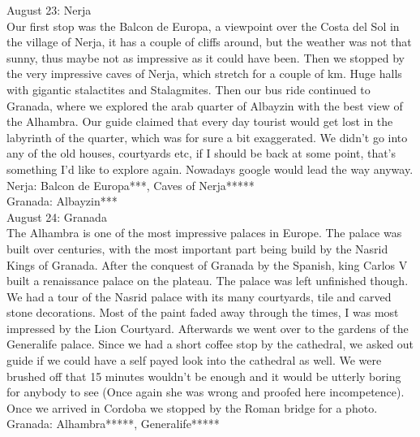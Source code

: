August 23: Nerja\\
Our first stop was the Balcon de Europa, a viewpoint over the Costa del Sol in the village of Nerja, it has a couple of cliffs around, but the weather was not that sunny, thus maybe not as impressive as it could have been. Then we stopped by the very impressive caves of Nerja, which stretch for a couple of km. Huge halls with gigantic stalactites and Stalagmites. Then our bus ride continued to Granada, where we explored the arab quarter of Albayzin with the best view of the Alhambra. Our guide claimed that every day tourist would get lost in the labyrinth of the quarter, which was for sure a bit exaggerated. We didn't go into any of the old houses, courtyards etc, if I should be back at some point, that's something I'd like to explore again. Nowadays google would lead the way anyway.\\


Nerja: Balcon de Europa***, Caves of Nerja*****\\
Granada: Albayzin***\\

August 24: Granada\\
The Alhambra is one of the most impressive palaces in Europe. The palace was built over centuries, with the most important part being build by the Nasrid Kings of Granada. After the conquest of Granada by the Spanish, king Carlos V built a renaissance palace on the plateau. The palace was left unfinished though. We had a tour of the Nasrid palace with its many courtyards, tile and carved stone decorations. Most of the paint faded away through the times, I was most impressed by the Lion Courtyard. Afterwards we went over to the gardens of the Generalife palace. Since we had a short coffee stop by the cathedral, we asked out guide if we could have a self payed look into the cathedral as well. We were brushed off that 15 minutes wouldn't be enough and it would be utterly boring for anybody to see (Once again she was wrong and proofed here incompetence). Once we arrived in Cordoba we stopped by the Roman bridge for a photo.\\

Granada: Alhambra*****, Generalife*****\\

